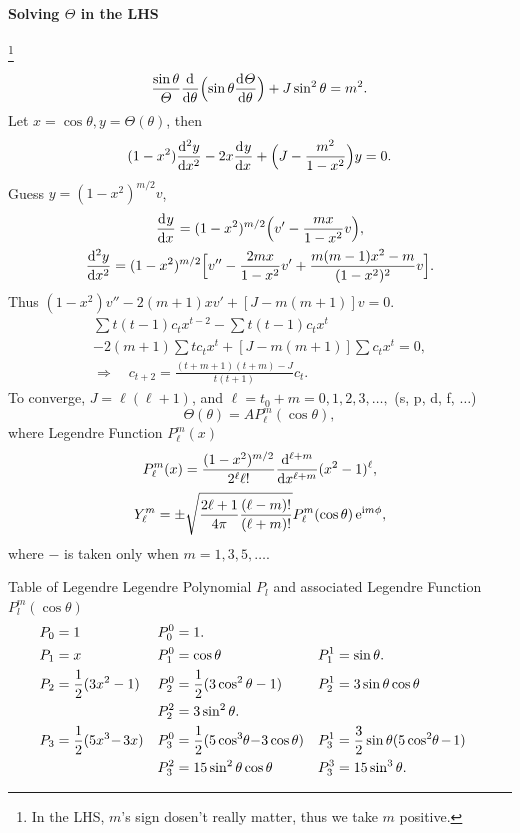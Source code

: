 \documentclass{article}
\newcommand{\ko}[1]{\hspace{-#1 pt}}
\begin{document}
\paragraph{Solving $\varTheta$ in the LHS}\ko7\footnote{In the LHS, $m$'s sign dosen't really matter, thus we take $m$ positive.}
$$\frac{\sin\theta}\varTheta\dd \theta\Bigp{\sin\theta\dv\varTheta\theta}+J\sin^2\theta=m^2.$$
Let $x=\cos\theta,y=\varTheta(\theta)$, then
$$(1-x^2)\dv[2] yx-2x\dv yx+\Bigp{J-\frac{m^2}{1-x^2}}y=0.$$
Guess $y=(1-x^2)^{m/2}v$,
\begin{gather*}
	\dv yx=(1-x^2)^{m/2}\Bigp{v'-\frac{mx}{1-x^2}v},\\
	\dv[2] yx=(1-x^2)^{m/2}\Bigb{v''-\frac{2mx}{1-x^2}v'+\frac{m(m-1)x^2-m}{(1-x^2)^2}v}.
\end{gather*}
Thus $(1-x^2)v''-2(m+1)xv'+[J-m(m+1)]v=0.$
\begin{gather*}
	\sum t(t-1)c_tx^{t-2}-\sum t(t-1)c_tx^t\\
	-2(m+1)\sum tc_tx^t+[J-m(m+1)]\sum c_tx^t=0,\\
	\Rightarrow\quad c_{t+2}=\frac{(t+m+1)(t+m)-J}{t(t+1)}c_t.
\end{gather*}
To converge, $J=\ell(\ell+1)$, and $\ell=t_0+m=0,1,2,3,\ldots,$ (s, p, d, f, $\ldots$)
$$\varTheta(\theta)=AP_\ell^m(\cos\theta),$$
where Legendre Function $P_\ell^m(x)$
$$P_\ell^m(x)=\frac{(1-x^2)^{m/2}}{2^\ell\ell!}\frac{\d^{\ell+m}}{\d x^{\ell+m}}(x^2-1)^\ell,$$
$$Y_\ell^m=\pm\sqrt{\frac{2\ell+1}{4\pi}\frac{(\ell-m)!}{(\ell+m)!}}P_\ell^m(\cos\theta)\e^{\i m\phi},$$
where $-$ is taken only when $m=1,3,5,\ldots.$
\begin{example}{Table of Legendre}{}
	Legendre Polynomial $P_l$ and associated Legendre Function $P_l^m(\cos\theta)$%
	\begin{align*}
		P_0 & =1                        & P_0^0 & =1.                                                                                                       \\
		P_1 & =x                        & P_1^0 & =\cos\theta                                     & P_1^1 & =\sin\theta.                                    \\
		P_2 & =\frac12(3x^2-1)          & P_2^0 & =\frac12(3\cos^2\theta-1)                       & P_2^1 & =3\sin\theta\cos\theta                          \\
		    &                           & P_2^2 & =3\sin^2\theta.                                                                                           \\
		P_3 & =\frac12(5x^3\ko2-\ko13x) & P_3^0 & =\frac12(5\cos^3\ko2\theta\ko2-\ko23\cos\theta) & P_3^1 & =\frac32\sin\theta(5\cos^2\ko2\theta\ko1-\ko11) \\
		    &                           & P_3^2 & =15\sin^2\theta\cos\theta                       & P_3^3 & =15\sin^3\theta.
	\end{align*}
\end{example}
\end{document}

